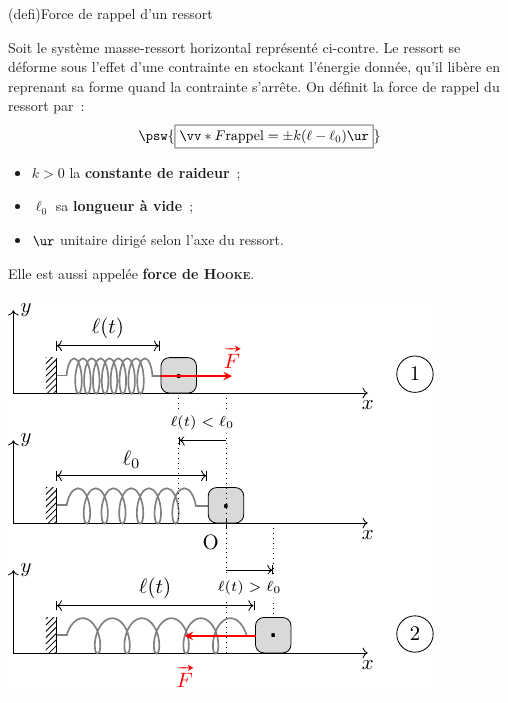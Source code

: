 \documentclass[../../main/main.tex]{subfiles}
\begin{document}
\begin{tcb*}[sidebyside, righthand ratio=.45](defi){Force de rappel d'un ressort}

	Soit le système masse-ressort horizontal représenté ci-contre. Le ressort se
	déforme sous l'effet d'une contrainte en stockant l'énergie donnée, qu'il
	libère en reprenant sa forme quand la contrainte s'arrête. On définit la
	force de rappel du ressort par~:
	\begin{equation*}
		\psw{\boxed{\vv*{F}{\rm rappel} = \pm k(\ell - \ell_0)\ur}}
	\end{equation*}
	\begin{itemize}
		\item $k > 0$ la \textbf{constante de raideur}~;
		\item $\ell_0$ sa \textbf{longueur à vide}~;
		\item $\ur$ unitaire dirigé selon l'axe du ressort.
	\end{itemize}
	\begin{center}
		Elle est aussi appelée \textbf{force de \textsc{Hooke}}.
	\end{center}
	\tcblower
	\begin{center}
		\includegraphics[width=\linewidth]{ressort_def}
	\end{center}
\end{tcb*}
\end{document}
